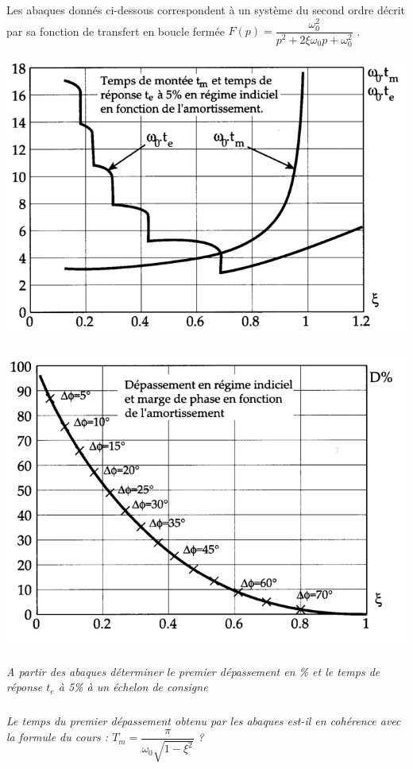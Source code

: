 \documentclass[11pt,oneside]{article}
\begin{document}


Les abaques donnés ci-dessous correspondent à un système du second ordre décrit par sa fonction de transfert en boucle fermée $F(p)=\dfrac{\omega_0^2}{p^2+2\xi\omega_0 p + \omega_0^2}$ .

\begin{center}
\includegraphics[width=.6\textwidth]{png/figure_09}

\includegraphics[width=.6\textwidth]{png/figure_10}
\end{center}

\subparagraph{}
\textit{A partir des abaques déterminer le premier dépassement en \% et le temps de réponse $t_e$  à 5\% à un échelon de consigne}


\subparagraph{}
\textit{Le temps du premier dépassement obtenu par les abaques est-il en cohérence avec la formule du cours : $T_m=\dfrac{\pi}{\omega_0\sqrt{1-\xi^2}}$ ?}

\end{document}
